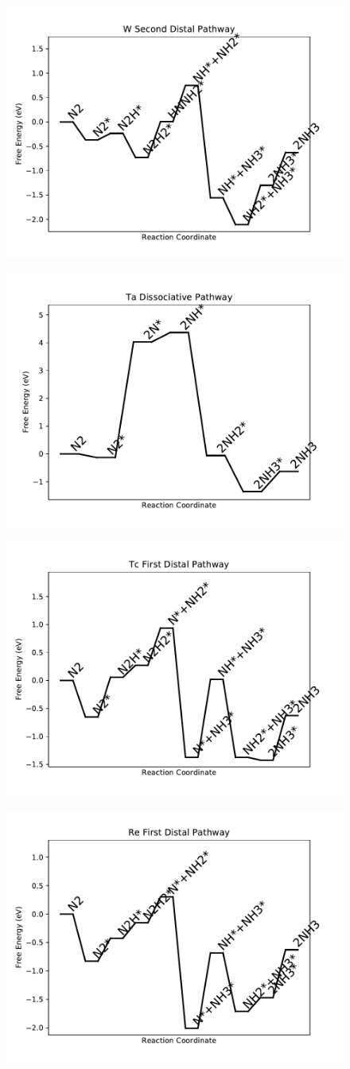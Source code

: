 \documentclass[journal=jacsat,manuscript=article]{achemso}
\begin{document}
\begin{figure}
\includegraphics[width=0.5\linewidth]{data/plots/W_distal_2.pdf}
\label{fig:W_distal_2}
\end{figure}

\begin{figure}
\includegraphics[width=0.5\linewidth]{data/plots/Ta_dissociative.pdf}
\label{fig:Ta_dissociative}
\end{figure}

\begin{figure}
\includegraphics[width=0.5\linewidth]{data/plots/Tc_distal_1.pdf}
\label{fig:Tc_distal_1}
\end{figure}

\begin{figure}
\includegraphics[width=0.5\linewidth]{data/plots/Re_distal_1.pdf}
\label{fig:Re_distal_1}
\end{figure}
\end{document}

